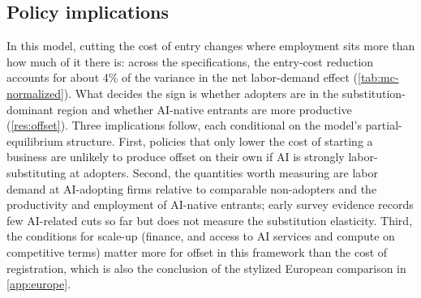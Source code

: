 \subsection{Policy implications}\label{sec:disc-policy}

In this model, cutting the cost of entry changes where employment sits more than how much of it there is: across the specifications, the entry-cost reduction accounts for about 4\% of the variance in the net labor-demand effect (\cref{tab:mc-normalized}).
What decides the sign is whether adopters are in the substitution-dominant region and whether AI-native entrants are more productive (\cref{res:offset}).
Three implications follow, each conditional on the model's partial-equilibrium structure.
First, policies that only lower the cost of starting a business are unlikely to produce offset on their own if AI is strongly labor-substituting at adopters.
Second, the quantities worth measuring are labor demand at AI-adopting firms relative to comparable non-adopters and the productivity and employment of AI-native entrants; early survey evidence \citep{bonney2026} records few AI-related cuts so far but does not measure the substitution elasticity.
Third, the conditions for scale-up (finance, and access to AI services and compute on competitive terms) matter more for offset in this framework than the cost of registration, which is also the conclusion of the stylized European comparison in \cref{app:europe}.
